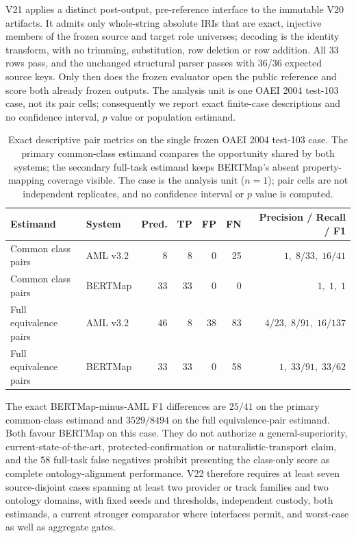 V21 applies a distinct post-output, pre-reference interface to the immutable
V20 artifacts. It admits only whole-string absolute IRIs that are exact,
injective members of the frozen source and target role universes; decoding is
the identity transform, with no trimming, substitution, row deletion or row
addition. All 33 rows pass, and the unchanged structural parser passes with
36/36 expected source keys. Only then does the frozen evaluator open the public
reference and score both already frozen outputs. The analysis unit is one OAEI
2004 test-103 case, not its pair cells; consequently we report exact finite-case
descriptions and no confidence interval, $p$ value or population estimand.

\begin{table}[htbp]
\centering
\caption{Exact descriptive pair metrics on the single frozen OAEI 2004
test-103 case. The primary common-class estimand compares the opportunity
shared by both systems; the secondary full-task estimand keeps BERTMap's absent
property-mapping coverage visible. The case is the analysis unit ($n=1$); pair
cells are not independent replicates, and no confidence interval or $p$ value
is computed.}
\label{tab:p3-v21-one-case}
\begin{tabular}{llrrrrr}
\toprule
Estimand & System & Pred. & TP & FP & FN & Precision / Recall / F1 \\
\midrule
Common class pairs & AML v3.2 & 8 & 8 & 0 & 25 & $1,\;8/33,\;16/41$ \\
Common class pairs & BERTMap & 33 & 33 & 0 & 0 & $1,\;1,\;1$ \\
Full equivalence pairs & AML v3.2 & 46 & 8 & 38 & 83 & $4/23,\;8/91,\;16/137$ \\
Full equivalence pairs & BERTMap & 33 & 33 & 0 & 58 & $1,\;33/91,\;33/62$ \\
\bottomrule
\end{tabular}
\end{table}

The exact BERTMap-minus-AML F1 differences are $25/41$ on the primary
common-class estimand and $3529/8494$ on the full equivalence-pair estimand.
Both favour BERTMap on this case. They do not authorize a general-superiority,
current-state-of-the-art, protected-confirmation or naturalistic-transport
claim, and the 58 full-task false negatives prohibit presenting the class-only
score as complete ontology-alignment performance. V22 therefore requires at
least seven source-disjoint cases spanning at least two provider or track
families and two ontology domains, with fixed seeds and thresholds, independent
custody, both estimands, a current stronger comparator where interfaces permit,
and worst-case as well as aggregate gates.

